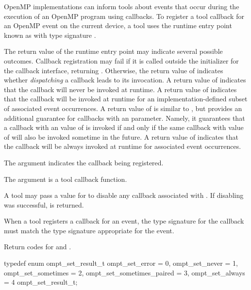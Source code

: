 OpenMP implementations can inform tools about events that occur during
the execution of an OpenMP program using callbacks.
To register a tool callback for an OpenMP event on the current device,
a tool uses the runtime entry point
known as 
with type signature .

The return value of the  runtime entry point may indicate several possible
outcomes. Callback registration may fail if it is called outside the initializer for the
callback interface, returning .
Otherwise, the return value of 
indicates whether \emph{dispatching} a callback leads to its invocation.
A return value of  indicates that the callback
will never be invoked at runtime.
A return value of  indicates that the callback
will be invoked at runtime for an implementation-defined subset of
associated event occurrences.
A return value of  is similar to
, but provides an additional guarantee for
callbacks with an  parameter. Namely, it guarantees that a callback
with an  value of  is invoked if and only if
the same callback with  value of  will
also be invoked sometime in the future.
A return value of  indicates that the callback
will be always invoked at runtime for associated event occurrences.

\argdesc

The argument  indicates the callback being registered.

The argument  is a tool callback function.

A tool may pass a  value for  to disable
any callback associated with . If disabling was successful,
 is returned.

\constraints
When a tool registers a callback for an event, the type
signature for the callback must match the type signature appropriate for the
event.

\begin{table}
\caption{Return codes for  and
    .\label{table:ToolsSupport_set_rc}}
\begin{omptEnum}
typedef enum ompt_set_result_t {
  ompt_set_error            = 0,
  ompt_set_never            = 1,
  ompt_set_sometimes        = 2,
  ompt_set_sometimes_paired = 3,
  ompt_set_always           = 4
} ompt_set_result_t;
\end{omptEnum}
\vspace*{1ex}
\end{table}

